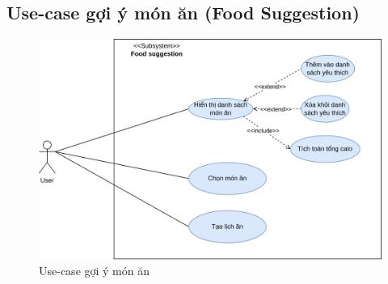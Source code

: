 \subsection{Use-case gợi ý món ăn (Food Suggestion)}
    \begin{figure}[h]
        \centering
        \includegraphics[width=1\linewidth]{images/use-case diagram/food-suggestion_use-case.png}
        \caption{Use-case gợi ý món ăn}
    \end{figure}
    
